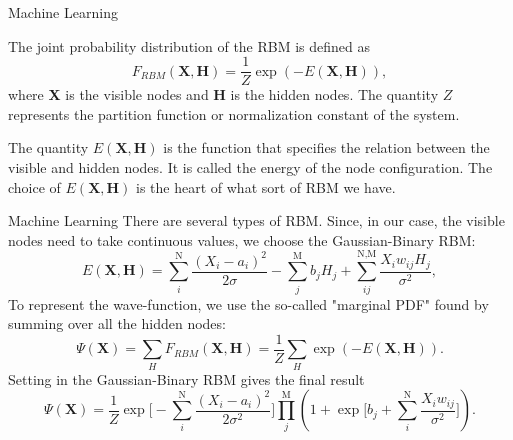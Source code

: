 \documentclass[10pt]{beamer}
\begin{document}
\begin{frame}[fragile]{Machine Learning}
	
	The joint probability distribution of the RBM is defined as 
	\begin{equation*}
	F_{RBM}(\textbf{X},\textbf{H}) = \frac{1}{Z} \exp(-E(\textbf{X},\textbf{H})),
	\end{equation*}
	where \textbf{X} is the visible nodes and \textbf{H} is the hidden nodes. The quantity $Z$ represents the partition function or normalization constant of the system. 
	
	The quantity $E(\textbf{X},\textbf{H})$ is the function that specifies the relation between the visible and hidden nodes. It is called the energy of the node configuration. The choice of $E(\textbf{X},\textbf{H})$ is the heart of what sort of RBM we have.
	
\end{frame}

\begin{frame}[fragile]{Machine Learning}
	There are several types of RBM. Since, in our case, the visible nodes need to take continuous values, we choose the Gaussian-Binary RBM:
	\begin{equation*}
	E(\textbf{X},\textbf{H}) = \sum_i^{\text{N}}\frac{(X_i-a_i)^2}{2\sigma} - \sum_j^{\text{M}}b_jH_j + \sum_{ij}^{\text{N,M}}\frac{X_iw_{ij}H_j}{\sigma^2},
	\label{eq_rbm}
	\end{equation*} 
	To represent the wave-function, we use the so-called "marginal PDF" found by summing over all the hidden nodes:
	\begin{equation*}
	\Psi(\textbf{X}) = \sum_HF_{RBM}(\textbf{X},\textbf{H}) = \frac{1}{Z}\sum_H\exp(-E(\textbf{X},\textbf{H})).
	\end{equation*}
	Setting in the Gaussian-Binary RBM gives the final result
	\begin{equation*}
	\Psi(\mathbf{X}) = \frac{1}{Z} \exp\bigg[-\sum_i^{\text{N}} \frac{(X_i-a_i)^2}{2\sigma^2}\bigg]\prod_j^{\text{M}} \left(  1 + \exp\bigg[b_j +\sum_i^{\text{N}} \frac{X_iw_{ij}}{\sigma^2}\bigg]\right).
	\label{eq_psi}
	\end{equation*}
\end{frame}
\end{document}
